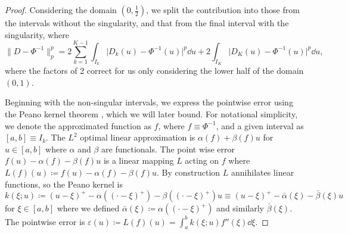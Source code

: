 \documentclass[9pt,a4paper,english]{extarticle}
\begin{document}
\begin{proof}
Considering the domain $ (0, \tfrac{1}{2}) $, we split the contribution into those from the intervals without the singularity, and that from the final interval with the singularity, where
\begin{equation*}
\lVert D - \Phi^{-1}\rVert_p^p   = 2  \sum_{k=1}^{K-1} \int_{I_k} \lvert D_k(u) - \Phi^{-1}(u)\rvert^p \dd{u}  + 2 \int_{I_K} \lvert D_K(u) - \Phi^{-1}(u)\rvert^p \dd{u},
\end{equation*}
where the factors of 2 correct for us only considering the lower half of the domain $ (0, 1) $. 

Beginning with the non-singular intervals, we express the pointwise error using the Peano kernel theorem \citep{iserles2009first,powell1981approximation}, which we will later bound. For notational simplicity, we denote the approximated function as $ f $, where $ f \equiv \Phi^{-1} $, and a given interval as $ [a,b] \equiv I_k  $. The $ L^2 $ optimal linear approximation is $ \alpha(f) + \beta(f) u $ for $ u \in [a,b] $ where $ \alpha $ and $ \beta $ are functionals. The point wise error $ f(u) - \alpha(f) - \beta(f)u $ is a linear mapping $ L $ acting on $ f $ where $ L(f)(u) \coloneqq  f(u) - \alpha(f) - \beta(f)u $. By construction $ L $ annihilates linear functions, so the Peano kernel is $ k(\xi; u) \coloneqq (u - \xi)^+ - \alpha((\cdot - \xi)^+) - \beta((\cdot - \xi)^+)u \equiv (u - \xi)^+ - \bar{\alpha}(\xi) - \bar{\beta}(\xi)u $ for $ \xi \in [a,b] $ where we defined $ \bar{\alpha}(\xi) \coloneqq \alpha((\cdot - \xi)^+) $ and similarly $ \bar{\beta}(\xi) $. The pointwise error is $ \varepsilon(u) \coloneqq L(f)(u) = \int_{a}^{b} k(\xi; u) f''(\xi) \dd{\xi} $.


\end{proof}
\end{document}
